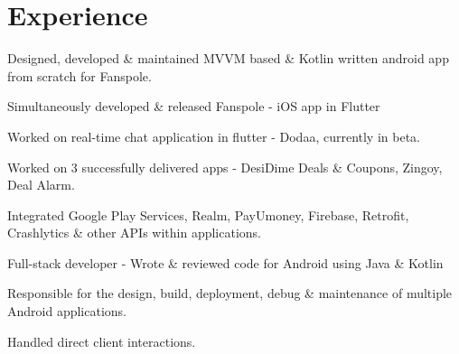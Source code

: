 \documentclass[]{deedy-resume-openfont}
\begin{document}
\begin{minipage}[t]{0.66\textwidth} 


 \section{Experience}


\vspace{\topsep} %
\begin{tightemize}
\item Designed, developed \& maintained MVVM based \& Kotlin written android app from scratch for Fanspole.
\item Simultaneously developed \& released Fanspole - iOS app in Flutter
\item Worked on real-time chat application in flutter - Dodaa, currently in beta.
\end{tightemize}
\sectionsep

\vspace{\topsep} %
\begin{tightemize}
\item Worked on 3 successfully delivered apps - DesiDime Deals \& Coupons, Zingoy, Deal Alarm.
\item Integrated Google Play Services, Realm, PayUmoney, Firebase, Retrofit, Crashlytics \& other APIs within applications. 
\item Full-stack developer - Wrote \& reviewed code for Android using Java \& Kotlin
\end{tightemize}
\sectionsep

\begin{tightemize}
\item Responsible for the design, build, deployment, debug \& maintenance of multiple Android applications.
\item Handled direct client interactions.
\end{tightemize}
\sectionsep


\end{minipage}
\end{document}
